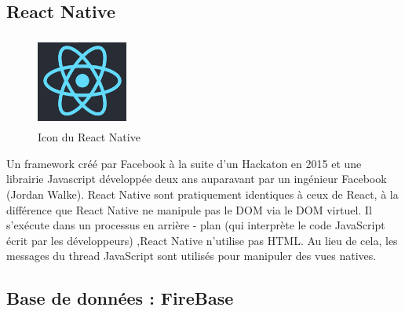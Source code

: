 



\subsection{React Native}

\begin{figure}[H]
  \centering
 \includegraphics[width=3cm,height=3cm,keepaspectratio]{figure/fig7.png}
  \caption{Icon du React Native }
\end{figure}

 Un framework créé par Facebook à la suite d'un Hackaton en 2015 et une librairie Javascript développée deux ans auparavant par un ingénieur Facebook (Jordan Walke). React Native sont pratiquement identiques à ceux de React, à la différence que React Native ne manipule pas le DOM via le DOM virtuel. Il s'exécute dans un processus en arrière - plan (qui interprète le code JavaScript écrit par les développeurs) ,React Native n'utilise pas HTML. Au lieu de cela, les messages du thread JavaScript sont utilisés pour manipuler des vues natives.


\subsection{Base de données : FireBase}

